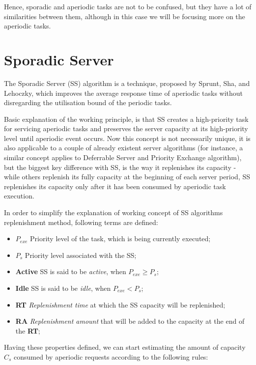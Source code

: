 \documentclass[conference]{IEEEtran}
\begin{document}
Hence, sporadic and aperiodic tasks are not to be confused, but they have a lot of similarities between them, although in this case we will be focusing more on the aperiodic tasks.

\section{Sporadic Server}
The Sporadic Server (SS) algorithm is a technique, proposed by Sprunt, Sha,
and Lehoczky, which improves the average response time of aperiodic tasks without disregarding the utilisation bound of the periodic tasks.

Basic explanation of the working principle, is that SS creates a high-priority task for servicing aperiodic tasks and preserves the server capacity at its high-priority level until aperiodic event occurs. Now this concept is not necessarily unique, it is also applicable to a couple of already existent server algorithms (for instance, a similar concept applies to Deferrable Server and Priority Exchange algorithm), but the biggest key difference with SS, is the way it replenishes its capacity - while others replenish its fully capacity at the beginning of each server period, SS replenishes its capacity only after it has been consumed by aperiodic task execution.

In order to simplify the explanation of working concept of SS algorithms replenishment method, following terms are defined:

\begin{itemize}
    \item $P_{exe}$ Priority level of the task, which is being currently executed;
    \item $P_s$ Priority level associated with the SS;
    \item \textbf{Active} SS is said to be \textit{active}, when $P_{exe} \geq P_s$;
    \item \textbf{Idle} SS is said to be \textit{idle}, when $P_{exe} < P_s$;
    \item \textbf{RT} \textit{Replenishment time} at which the SS capacity will be replenished;
    \item \textbf{RA} \textit{Replenishment amount} that will be added to the capacity at the end of the \textbf{RT};
\end{itemize}

Having these properties defined, we can start estimating the amount of capacity $C_s$ consumed by aperiodic requests according to the following rules:
\end{document}

